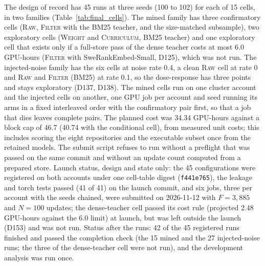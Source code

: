 \documentclass[10pt,twocolumn]{article}
\makeatletter
\renewcommand\paragraph{\@startsection{paragraph}{4}{\z@}{3pt}{-0.5em}{\normalfont\bfseries}}
\makeatother
\begin{document}
\paragraph{Final-run design.} The design of record has 45 runs at three seeds (100 to 102) for each of 15 cells, in two families (Table~\ref{tab:final_cells}). %
The mined family has three confirmatory cells (\textsc{Raw}, \textsc{Filter} with the BM25 teacher, and the size-matched subsample), two exploratory cells (\textsc{Weight} and
\textsc{Curriculum}, BM25 teacher) and one exploratory cell that exists only if a full-store pass of the dense teacher costs at most 6.0 GPU-hours (\textsc{Filter} with SweRankEmbed-Small, D125), which was not run.
The injected-noise family has the six cells at noise rate 0.4, a clean \textsc{Raw} cell at rate 0 and \textsc{Raw} and \textsc{Filter} (BM25) at rate 0.1, so the dose-response has three points and stays
exploratory (D137, D138). %
The mined cells run on one cluster account and the injected cells on another, one GPU job per account and seed running its arms in a fixed interleaved order with the confirmatory pair first, so
that a job that dies leaves complete pairs. %
The planned cost was 34.34 GPU-hours against a block cap of 46.7 (40.74 with the conditional cell), from measured unit costs; this includes scoring the eight repositories and the executable subset once from the retained models. %
The submit script refuses to run without a preflight that was passed on the same commit and without an update count computed from a prepared store.
Launch status, design and state only: the 45 configurations were registered on both accounts under one cell-table digest (\texttt{f441e765}), the leakage and torch tests passed
(41 of 41) on the launch commit, and six jobs, three per account with the seeds chained, were submitted on 2026-11-12 with $F=3{,}885$ and $N=100$ updates; the dense-teacher cell
passed its cost rule (projected 2.48 GPU-hours against the 6.0 limit) at launch, but was left outside the launch (D153) and was not run. %
Status after the runs: 42 of the 45 registered runs finished and passed the completion check (the 15 mined and the 27 injected-noise runs; the three of the dense-teacher cell were not run), and the development analysis was run once. %
\end{document}
